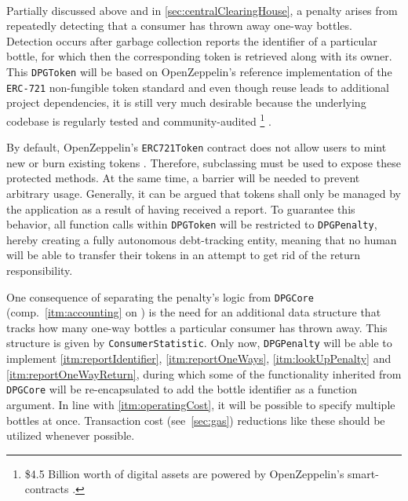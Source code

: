 \begin{description}[format={\storedescriptionlabel}]
	\item[Penalization\label{itm:penalty}]
	\hfill \\
	Partially discussed above and in \autoref{sec:centralClearingHouse}, a penalty arises from repeatedly detecting that a consumer has thrown away one-way bottles. Detection occurs after garbage collection reports the identifier of a particular bottle, for which then the corresponding token is retrieved along with its owner. This \texttt{DPGToken} will be based on OpenZeppelin's reference implementation of the \texttt{\acs{ERC}-721} non-fungible token standard and even though reuse leads to additional project dependencies, it is still very much desirable because the underlying codebase is regularly tested and community-audited \footnote{\$4.5 Billion worth of digital assets are powered by OpenZeppelin's smart-contracts \cite{openZeppelin}.} \cite{openZeppelinGitHub}. 
	
	By default, OpenZeppelin's \texttt{ERC721Token} contract does not allow users to mint new or burn existing tokens \cite{openZeppelinGitHub}. Therefore, subclassing must be used to expose these protected methods. At the same time, a barrier will be needed to prevent arbitrary usage. Generally, it can be argued that tokens shall only be managed by the application as a result of having received a report. To guarantee this behavior, all function calls within \texttt{DPGToken} will be restricted to \texttt{DPGPenalty}, hereby creating a fully autonomous debt-tracking entity, meaning that no human will be able to transfer their tokens in an attempt to get rid of the return responsibility.
	
	One consequence of separating the penalty's logic from \texttt{DPGCore} (comp.~\ref{itm:accounting} on ) is the need for an additional data structure that tracks how many one-way bottles a particular consumer has thrown away. This structure is given by \texttt{ConsumerStatistic}. Only now, \texttt{DPGPenalty} will be able to implement \ref{itm:reportIdentifier}, \ref{itm:reportOneWays}, \ref{itm:lookUpPenalty} and \ref{itm:reportOneWayReturn}, during which some of the functionality inherited from \texttt{DPGCore} will be re-encapsulated to add the bottle identifier as a function argument. In line with \ref{itm:operatingCost}, it will be possible to specify multiple bottles at once. Transaction cost (see~\ref{sec:gas}) reductions like these should be utilized whenever possible.
\end{description}

